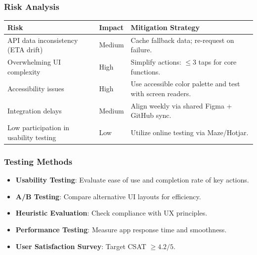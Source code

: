 \subsubsection{Risk Analysis}
\renewcommand{\arraystretch}{1.12}
\begin{tabularx}{\textwidth}{|>{\raggedright\arraybackslash}p{3.5cm}|>{\raggedright\arraybackslash}p{2.6cm}|>{\raggedright\arraybackslash}X|}
\hline
	\textbf{Risk} & \textbf{Impact} & \textbf{Mitigation Strategy} \\
\hline
API data inconsistency (ETA drift) & Medium & Cache fallback data; re-request on failure. \\
\hline
Overwhelming UI complexity & High & Simplify actions: $\le 3$ taps for core functions. \\
\hline
Accessibility issues & High & Use accessible color palette and test with screen readers. \\
\hline
Integration delays & Medium & Align weekly via shared Figma + GitHub sync. \\
\hline
Low participation in usability testing & Low & Utilize online testing via Maze/Hotjar. \\
\hline
\end{tabularx}

\subsubsection{Testing Methods}
\begin{itemize}
  \item \textbf{Usability Testing}: Evaluate ease of use and completion rate of key actions.
  \item \textbf{A/B Testing}: Compare alternative UI layouts for efficiency.
  \item \textbf{Heuristic Evaluation}: Check compliance with UX principles.
  \item \textbf{Performance Testing}: Measure app response time and smoothness.
  \item \textbf{User Satisfaction Survey}: Target CSAT $\ge 4.2/5$.
\end{itemize}

